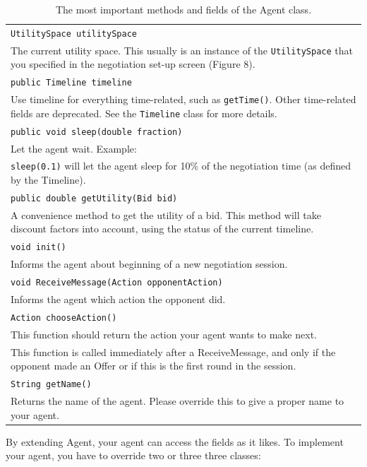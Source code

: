 \documentclass[]{article}
\begin{document}
\begin{table}
\begin{tabular}{m{}}
\hline
\texttt{UtilitySpace utilitySpace}\\
The current utility space. This usually is an instance of the \texttt{UtilitySpace} that you specified in the negotiation set-up screen (Figure 8).\\
\hline
\texttt{public Timeline timeline}\\
Use timeline for everything time-related, such as \texttt{getTime()}. Other time-related fields are deprecated. See the \texttt{Timeline} class for more details.\\
\hline
\texttt{public void sleep(double fraction)}\\
Let the agent wait. Example:\\
\texttt{sleep(0.1)} will let the agent sleep for 10\% of the negotiation time (as defined by the Timeline).\\
\hline
\texttt{public double getUtility(Bid bid)}\\
A convenience method to get the utility of a bid. This method will take discount factors into account, using the status of the current timeline.\\
\hline
\texttt{void init()}\\
Informs the agent about beginning of a new negotiation session.\\
\hline
\texttt{void ReceiveMessage(Action opponentAction)}\\
Informs the agent which action the opponent did.\\
\hline
\texttt{Action chooseAction()}\\
This function should return the action your agent wants to make next.\\
This function is called immediately after a ReceiveMessage, and only if the opponent made an Offer or if this is the first round in the session.\\
\hline
\texttt{String getName()}\\
Returns the name of the agent. Please override this to give a proper name to your agent.\\
\hline
\end{tabular}
\caption{The most important methods and fields of the Agent class.}
\end{table}

By extending Agent, your agent can access the fields as it likes.  
To implement your agent, you have to override two or three three classes:
\end{document}
